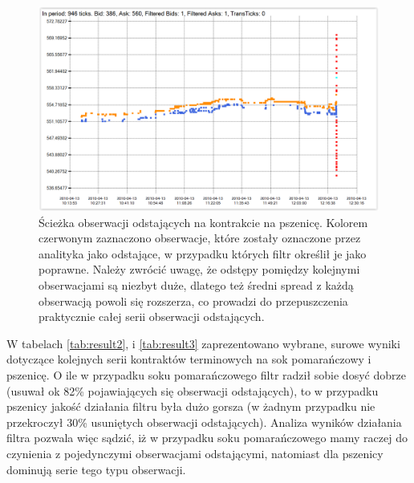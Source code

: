 \documentclass[a4paper,12pt,openany, DIV=calc, headsepline]{scrbook}
\begin{document}
\begin{figure}[h]
  \centering
  \includegraphics[scale=0.5]{wykresy/fzwh11.PNG}
  \caption{Ścieżka obserwacji odstających na kontrakcie na pszenicę. Kolorem czerwonym zaznaczono obserwacje, które zostały oznaczone przez analityka jako odstające, w przypadku których filtr określił je jako poprawne. Należy zwrócić uwagę, że odstępy pomiędzy kolejnymi obserwacjami są niezbyt duże, dlatego też średni spread z każdą obserwacją powoli się rozszerza, co prowadzi do przepuszczenia praktycznie całej serii obserwacji odstających.}
  \label{fig:fzwh11}
\end{figure}

W tabelach \ref{tab:result2}, i \ref{tab:result3} zaprezentowano wybrane, surowe wyniki dotyczące kolejnych serii kontraktów terminowych na sok pomarańczowy i pszenicę. O ile w przypadku soku pomarańczowego filtr radził sobie dosyć dobrze (usuwał ok 82\% pojawiających się obserwacji odstających), to w przypadku pszenicy jakość działania filtru była dużo gorsza (w żadnym przypadku nie przekroczył 30\% usuniętych obserwacji odstających). Analiza wyników działania filtra pozwala więc sądzić, iż w przypadku soku pomarańczowego mamy raczej do czynienia z pojedynczymi obserwacjami odstającymi, natomiast dla pszenicy dominują serie tego typu obserwacji.
\end{document}
